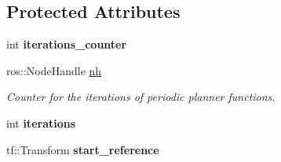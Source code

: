 \subsection*{Protected Attributes}
\begin{DoxyCompactItemize}
\item 
int {\bfseries iterations\+\_\+counter}\hypertarget{classPlanner_a99b577203757a2466e8a3424c28d3449}{}\label{classPlanner_a99b577203757a2466e8a3424c28d3449}

\item 
ros\+::\+Node\+Handle \hyperlink{classPlanner_a9714d036f444a07ce90be8d135b9a40c}{nh}\hypertarget{classPlanner_a9714d036f444a07ce90be8d135b9a40c}{}\label{classPlanner_a9714d036f444a07ce90be8d135b9a40c}

\begin{DoxyCompactList}\small\item\em Counter for the iterations of periodic planner functions. \end{DoxyCompactList}\item 
int {\bfseries iterations}\hypertarget{classPlanner_a19220ea8cd70f4f3bfa3e35e1250ed00}{}\label{classPlanner_a19220ea8cd70f4f3bfa3e35e1250ed00}

\item 
tf\+::\+Transform {\bfseries start\+\_\+reference}\hypertarget{classPlanner_aae0304ebd1813766f1437b80d5195e90}{}\label{classPlanner_aae0304ebd1813766f1437b80d5195e90}

\end{DoxyCompactItemize}
